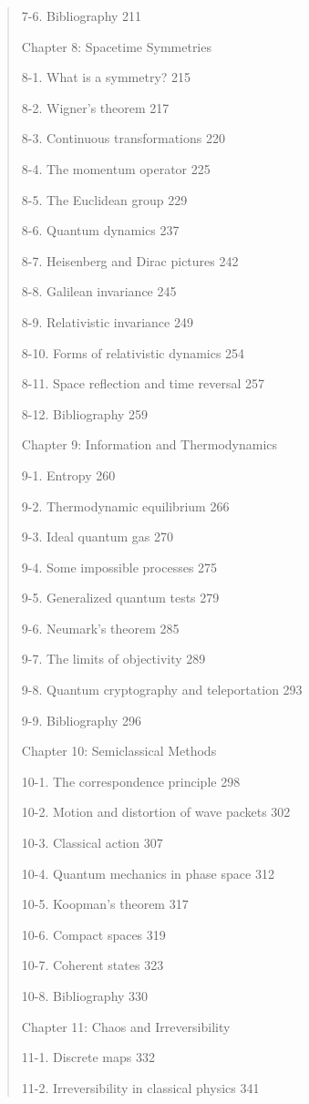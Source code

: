 \documentclass{article}
\begin{document}
\begin{quote}
7-6. Bibliography 211

Chapter 8: Spacetime Symmetries

8-1. What is a symmetry? 215

8-2. Wigner's theorem 217

8-3. Continuous transformations 220

8-4. The momentum operator 225

8-5. The Euclidean group 229

8-6. Quantum dynamics 237

8-7. Heisenberg and Dirac pictures 242

8-8. Galilean invariance 245

8-9. Relativistic invariance 249

8-10. Forms of relativistic dynamics 254

8-11. Space reflection and time reversal 257

8-12. Bibliography 259

Chapter 9: Information and Thermodynamics

9-1. Entropy 260

9-2. Thermodynamic equilibrium 266

9-3. Ideal quantum gas 270

9-4. Some impossible processes 275

9-5. Generalized quantum tests 279

9-6. Neumark's theorem 285

9-7. The limits of objectivity 289

9-8. Quantum cryptography and teleportation 293

9-9. Bibliography 296

Chapter 10: Semiclassical Methods

10-1. The correspondence principle 298

10-2. Motion and distortion of wave packets 302

10-3. Classical action 307

10-4. Quantum mechanics in phase space 312

10-5. Koopman's theorem 317

10-6. Compact spaces 319

10-7. Coherent states 323

10-8. Bibliography 330

Chapter 11: Chaos and Irreversibility

11-1. Discrete maps 332

11-2. Irreversibility in classical physics 341


\end{quote}
\end{document}

